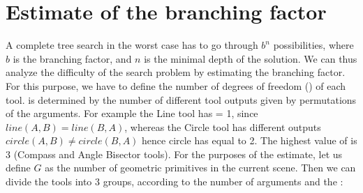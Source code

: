 \section{Estimate of the branching factor}
\label{degrees_of_freedom}
A complete tree search in the worst case has to go through $b^n$ possibilities, where $b$ is the branching factor, and $n$ is the minimal depth of the solution. We can thus analyze the difficulty of the search problem by estimating the branching factor.
\newline \newline
For this purpose, we have to define the number of degrees of freedom (\DOF{}) of each tool. \DOF{} is determined by the number of different tool outputs given by permutations of the arguments. For example the Line tool has \DOF{} = 1, since $line(A, B) = line(B, A)$, whereas the Circle tool has different outputs \newline$circle(A, B) \neq circle(B, A)$ hence circle has \DOF{}  equal to 2. The highest value of \DOF{} is 3 (Compass and Angle Bisector tools).
\newline \newline
\label{estimate_of_branching_factor}
For the purposes of the estimate, let us define $G$ as the number of geometric primitives in the current scene. Then we can divide the tools into 3 groups, according to the number of arguments and the \DOF{}:
